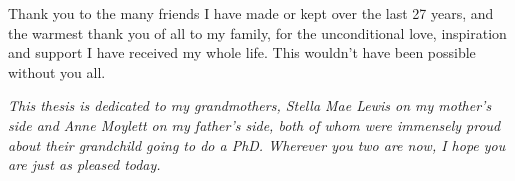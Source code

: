 Thank you to the many friends I have made or kept over the last 27 years, and the warmest thank you of all to my family, for the unconditional love, inspiration and support I have received my whole life. This wouldn't have been possible without you all.

\vspace{1cm}

\emph{This thesis is dedicated to my grandmothers, Stella Mae Lewis on my mother's side and Anne Moylett on my father's side, both of whom were immensely proud about their grandchild going to do a PhD. Wherever you two are now, I hope you are just as pleased today.}

